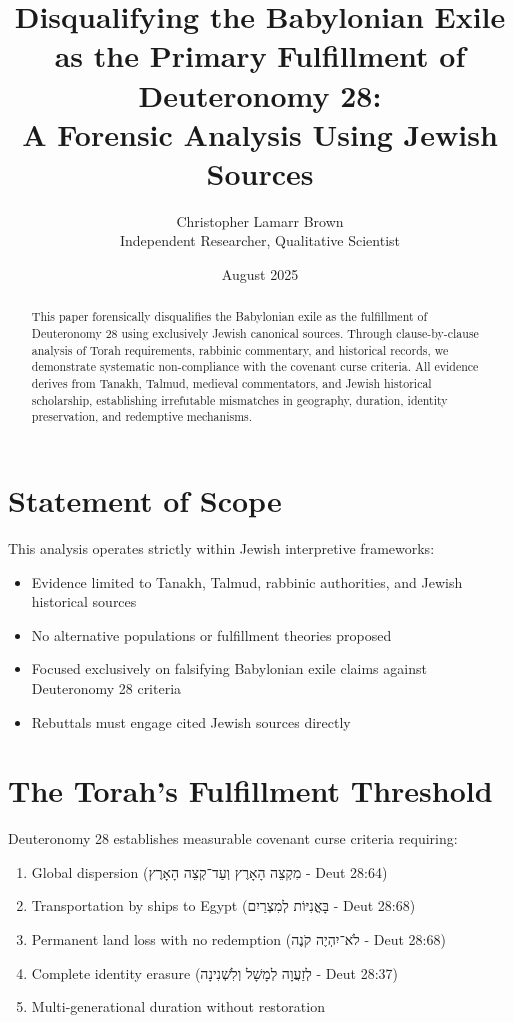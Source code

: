 \documentclass[12pt]{article}
\title{Disqualifying the Babylonian Exile as the Primary Fulfillment of Deuteronomy 28:\\ A Forensic Analysis Using Jewish Sources}
\author{Christopher Lamarr Brown\\Independent Researcher, Qualitative Scientist}
\date{August 2025}
\begin{document}
\maketitle

\begin{abstract}
This paper forensically disqualifies the Babylonian exile as the fulfillment of Deuteronomy 28 using exclusively Jewish canonical sources. Through clause-by-clause analysis of Torah requirements, rabbinic commentary, and historical records, we demonstrate systematic non-compliance with the covenant curse criteria. All evidence derives from Tanakh, Talmud, medieval commentators, and Jewish historical scholarship, establishing irrefutable mismatches in geography, duration, identity preservation, and redemptive mechanisms.
\end{abstract}

\section*{Statement of Scope}
This analysis operates strictly within Jewish interpretive frameworks:
\begin{itemize}
    \item Evidence limited to Tanakh, Talmud, rabbinic authorities, and Jewish historical sources
    \item No alternative populations or fulfillment theories proposed
    \item Focused exclusively on falsifying Babylonian exile claims against Deuteronomy 28 criteria
    \item Rebuttals must engage cited Jewish sources directly
\end{itemize}

\tableofcontents
\newpage

\section{The Torah’s Fulfillment Threshold}
Deuteronomy 28 establishes measurable covenant curse criteria requiring:
\begin{enumerate}
    \item Global dispersion \texthebrew{(מִקְצֵה הָאָרֶץ וְעַד־קְצֵה הָאָרֶץ - Deut 28:64)}
    \item Transportation by ships to Egypt \texthebrew{(בָּאֳנִיּוֹת לְמִצְרַיִם - Deut 28:68)}
    \item Permanent land loss with no redemption \texthebrew{(לֹא־יִהְיֶה קֹנֶה - Deut 28:68)}
    \item Complete identity erasure \texthebrew{(לְזַעֲוָה לְמָשָׁל וְלִשְׁנִינָה - Deut 28:37)}
    \item Multi-generational duration without restoration
\end{enumerate}
\end{document}
